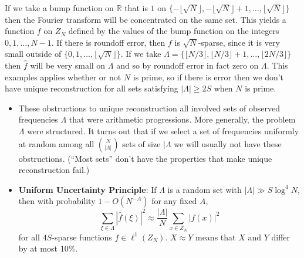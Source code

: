 \documentclass{slides}
\begin{document}
\begin{slide}
If we take a bump function on $\mathbb{R}$ that is $1$
on $\{-\lfloor \sqrt{N} \rfloor, -\lfloor \sqrt{N} \rfloor+1
,\ldots,\lfloor \sqrt{N} \rfloor\}$ then
the Fourier transform will be concentrated on the same set.
This yields a function $f$ on $Z_N$ defined by the values of the bump function on
the integers $0,1,\ldots,N-1$. If there is roundoff error, then
$f$ is $\sqrt{N}$-sparse, since it is very small outside of $\{0,1,\ldots,
\lfloor \sqrt{N} \rfloor\}$. If we take $\Lambda=\{\lfloor N/3 \rfloor,
\lfloor N/3 \rfloor + 1,\ldots, \lfloor 2N/3 \rfloor\}$ then
$\hat{f}$ will be very small on $\Lambda$ and so by roundoff error
in fact zero on $\Lambda$. This examples applies whether or not
$N$ is prime, so if there is error then we don't have unique reconstruction
for all sets satisfying $|\Lambda| \geq 2S$ when $N$ is prime.
\end{slide}

\begin{slide}
\begin{itemize}
\item These obstructions to unique reconstruction all involved 
sets of observed frequencies $\Lambda$ that were arithmetic progressions.
More generally, the problem $\Lambda$ were structured. It turns out that
if we select a set of frequencies uniformly at random among all
$\binom{N}{|\Lambda|}$ sets of size $|\Lambda$ we will usually not
have these obstructions. (``Most sets'' don't have the properties that
make unique reconstruction fail.)

\item \textbf{Uniform Uncertainty Principle}: If
$\Lambda$ is a random set with $|\Lambda| \gg S\log^4 N$, then
with probability $1-O(N^{-A})$ for any fixed $A$, 
\[
\sum_{\xi \in \Lambda}|\hat{f}(\xi)|^2 \approx \frac{|\Lambda|}{N}
\sum_{x \in Z_N}|f(x)|^2
\]
for all $4S$-sparse functions $f \in \ell^1(Z_N)$. $X \approx Y$ means
that $X$ and $Y$ differ by at most 10\%.
\end{itemize}
\end{slide}
\end{document}
